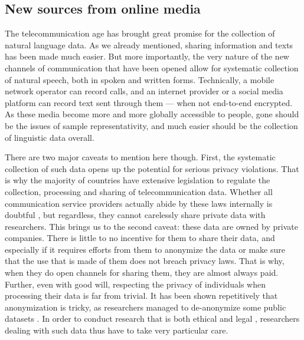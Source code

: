 \documentclass[../thesis.tex]{subfiles}
\begin{document}
\subsection{New sources from online media}
The telecommunication age has brought great promise for the collection of natural
language data. As we already mentioned, sharing information and texts has been made much
easier. But more importantly, the very nature of the new channels of
communication that have been opened allow for systematic collection of natural speech,
both in spoken and written forms. Technically, a mobile network operator can record
calls, and an internet provider or a social media platform can record text sent through them
--- when not end-to-end encrypted. As these media become more and more globally
accessible to people, gone should be the issues of sample representativity, and much
easier should be the collection of linguistic data overall.

There are two major caveats to mention here though. First, the systematic collection of
such data opens up the potential for serious privacy violations. That is why the
majority of countries have extensive legislation to regulate the collection, processing
and sharing of telecommunication data. Whether all communication service providers
actually abide by these laws internally is doubtful
\cite{GDPREnforcement,GDPRFines2023}, but regardless, they cannot carelessly share
private data with researchers. This brings us to the second caveat: these data are owned
by private companies. There is little to no incentive for them to share their data, and
especially if it requires efforts from them to anonymize the data or make sure that the
use that is made of them does not breach privacy laws. That is why, when they do open
channels for sharing them, they are almost always paid. Further, even with good will,
respecting the privacy of individuals when processing their data is far from trivial. It
has been shown repetitively that anonymization is tricky, as researchers managed
to de-anonymize some public datasets
\cite{NarayananRobustDeanonymization2008,GambsDeanonymizationAttack2014}. In order to
conduct research that is both ethical and legal
\cite{OhmBrokenPromises2009a,KulkBraveNew2012}, researchers dealing with such data thus
have to take very particular care.
\end{document}
